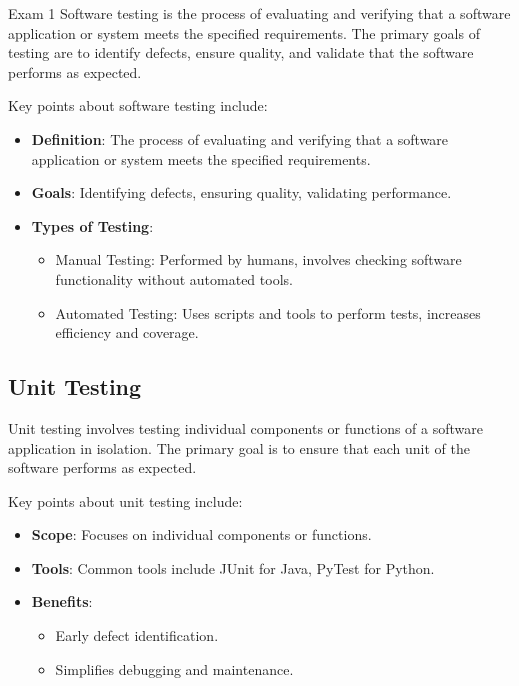 \begin{examnotes}{Exam 1}
    Software testing is the process of evaluating and verifying that a software application or system meets the specified requirements. The primary goals of testing are to identify defects, ensure 
    quality, and validate that the software performs as expected.
    
    \begin{highlight}
        Key points about software testing include:
        
        \begin{itemize}
            \item \textbf{Definition}: The process of evaluating and verifying that a software application or system meets the specified requirements.
            \item \textbf{Goals}: Identifying defects, ensuring quality, validating performance.
            \item \textbf{Types of Testing}:
                \begin{itemize}
                    \item Manual Testing: Performed by humans, involves checking software functionality without automated tools.
                    \item Automated Testing: Uses scripts and tools to perform tests, increases efficiency and coverage.
                \end{itemize}
        \end{itemize}
    \end{highlight}
    
    \subsection*{Unit Testing}
    
    Unit testing involves testing individual components or functions of a software application in isolation. The primary goal is to ensure that each unit of the software performs as expected.
    
    \begin{highlight}
        Key points about unit testing include:
        
        \begin{itemize}
            \item \textbf{Scope}: Focuses on individual components or functions.
            \item \textbf{Tools}: Common tools include JUnit for Java, PyTest for Python.
            \item \textbf{Benefits}:
                \begin{itemize}
                    \item Early defect identification.
                    \item Simplifies debugging and maintenance.
                \end{itemize}
        \end{itemize}
    \end{highlight}
    

\end{examnotes}
